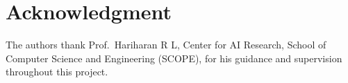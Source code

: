\documentclass[conference]{IEEEtran}
\begin{document}
\section*{Acknowledgment}
The authors thank Prof.\ Hariharan R L, Center for AI Research, School of Computer Science and Engineering
(SCOPE), for his guidance and supervision throughout this project.



\end{document}

